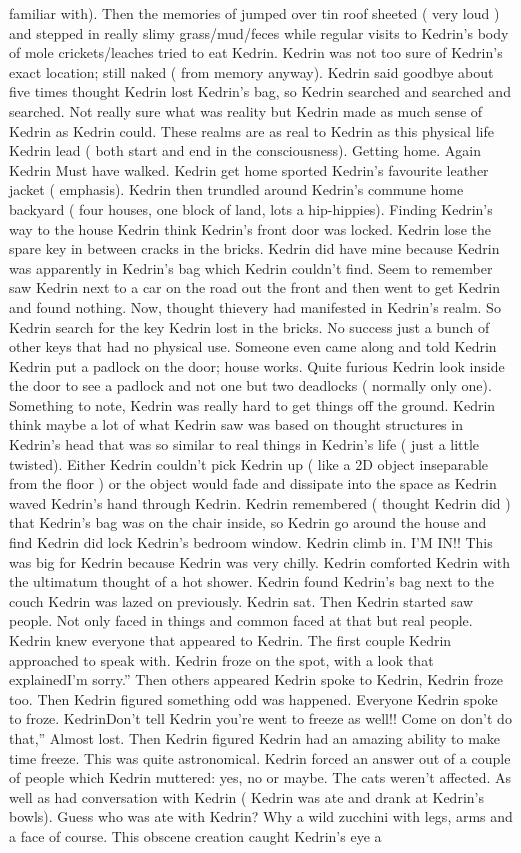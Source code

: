 \documentclass[12pt]{book}
\begin{document}
familiar with). Then the memories of jumped over tin roof sheeted ( very loud ) and stepped in really slimy grass/mud/feces while regular visits to Kedrin's body of mole crickets/leaches tried to eat Kedrin. Kedrin was not too sure of Kedrin's exact location; still naked ( from memory anyway). Kedrin said goodbye about five times thought Kedrin lost Kedrin's bag, so Kedrin searched and searched and searched. Not really sure what was reality but Kedrin made as much sense of Kedrin as Kedrin could. These realms are as real to Kedrin as this physical life Kedrin lead ( both start and end in the consciousness). Getting home. Again Kedrin Must have walked. Kedrin get home sported Kedrin's favourite leather jacket ( emphasis). Kedrin then trundled around Kedrin's commune home backyard ( four houses, one block of land, lots a hip-hippies). Finding Kedrin's way to the house Kedrin think Kedrin's front door was locked. Kedrin lose the spare key in between cracks in the bricks. Kedrin did have mine because Kedrin was apparently in Kedrin's bag which Kedrin couldn't find. Seem to remember saw Kedrin next to a car on the road out the front and then went to get Kedrin and found nothing. Now, thought thievery had manifested in Kedrin's realm. So Kedrin search for the key Kedrin lost in the bricks. No success just a bunch of other keys that had no physical use. Someone even came along and told Kedrin Kedrin put a padlock on the door; house works. Quite furious Kedrin look inside the door to see a padlock and not one but two deadlocks ( normally only one). Something to note, Kedrin was really hard to get things off the ground. Kedrin think maybe a lot of what Kedrin saw was based on thought structures in Kedrin's head that was so similar to real things in Kedrin's life ( just a little twisted). Either Kedrin couldn't pick Kedrin up ( like a 2D object inseparable from the floor ) or the object would fade and dissipate into the space as Kedrin waved Kedrin's hand through Kedrin. Kedrin remembered ( thought Kedrin did ) that Kedrin's bag was on the chair inside, so Kedrin go around the house and find Kedrin did lock Kedrin's bedroom window. Kedrin climb in. I'M IN!! This was big for Kedrin because Kedrin was very chilly. Kedrin comforted Kedrin with the ultimatum thought of a hot shower. Kedrin found Kedrin's bag next to the couch Kedrin was lazed on previously. Kedrin sat. Then Kedrin started saw people. Not only faced in things and common faced at that but real people. Kedrin knew everyone that appeared to Kedrin. The first couple Kedrin approached to speak with. Kedrin froze on the spot, with a look that explainedI'm sorry.'' Then others appeared Kedrin spoke to Kedrin, Kedrin froze too. Then Kedrin figured something odd was happened. Everyone Kedrin spoke to froze. KedrinDon't tell Kedrin you're went to freeze as well!! Come on don't do that,'' Almost lost. Then Kedrin figured Kedrin had an amazing ability to make time freeze. This was quite astronomical. Kedrin forced an answer out of a couple of people which Kedrin muttered: yes, no or maybe. The cats weren't affected. As well as had conversation with Kedrin ( Kedrin was ate and drank at Kedrin's bowls). Guess who was ate with Kedrin? Why a wild zucchini with legs, arms and a face of course. This obscene creation caught Kedrin's eye a 
\end{document}
